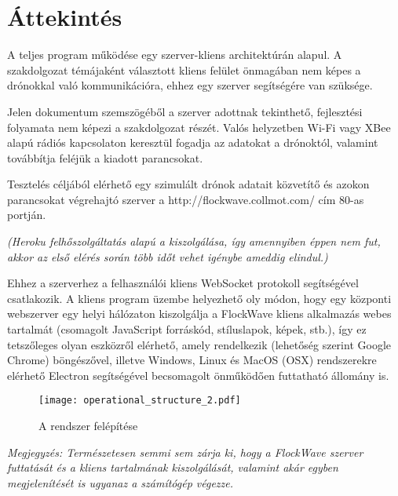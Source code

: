 \section{Áttekintés}

A teljes program működése egy szerver-kliens architektúrán alapul. A
szakdolgozat témájaként választott kliens felület önmagában nem képes a
drónokkal való kommunikációra, ehhez egy szerver segítségére van szüksége.

Jelen dokumentum szemszögéből a szerver adottnak tekinthető, fejlesztési
folyamata nem képezi a szakdolgozat részét. Valós helyzetben Wi-Fi vagy XBee
alapú rádiós kapcsolaton keresztül fogadja az adatokat a drónoktól, valamint
továbbítja feléjük a kiadott parancsokat.

Tesztelés céljából elérhető egy szimulált drónok adatait közvetítő és azokon
parancsokat végrehajtó szerver a http://flockwave.collmot.com/ cím 80-as
portján.

\textit{
  (Heroku felhőszolgáltatás alapú a kiszolgálása, így amennyiben éppen nem fut,
  akkor az első elérés során több időt vehet igénybe ameddig elindul.)
}

Ehhez a szerverhez a felhasználói kliens WebSocket protokoll segítségével
csatlakozik. A kliens program üzembe helyezhető oly módon, hogy egy központi
webszerver egy helyi hálózaton kiszolgálja a FlockWave kliens alkalmazás webes
tartalmát (csomagolt JavaScript forráskód, stíluslapok, képek, stb.), így ez
tetszőleges olyan eszközről elérhető, amely rendelkezik (lehetőség szerint
Google Chrome) böngészővel, illetve Windows, Linux és MacOS (OSX) rendszerekre
elérhető Electron segítségével becsomagolt önműködően futtatható állomány is.

\begin{figure}[H]
  \centering
    \texttt{[image: operational\_structure\_2.pdf]}
  \caption{A rendszer felépítése}
\end{figure}

\textit{
  Megjegyzés: Természetesen semmi sem zárja ki, hogy a FlockWave szerver
  futtatását és a kliens tartalmának kiszolgálását, valamint akár egyben
  megjelenítését is ugyanaz a számítógép végezze.
}
